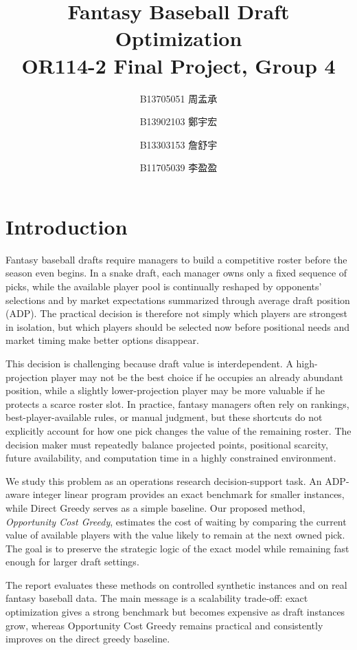 \documentclass[10pt,a4paper]{article}
\title{Fantasy Baseball Draft Optimization \\[0.5em] \large OR114-2 Final Project, Group 4}
\author{
B13705051 周孟承 \and
B13902103 鄭宇宏 \and
B13303153 詹舒宇 \and
B11705039 李盈盈
}
\date{}
\begin{document}
\maketitle

\section{Introduction}

Fantasy baseball drafts require managers to build a competitive roster before the season even begins. In a snake draft, each manager owns only a fixed sequence of picks, while the available player pool is continually reshaped by opponents' selections and by market expectations summarized through average draft position (ADP). The practical decision is therefore not simply which players are strongest in isolation, but which players should be selected now before positional needs and market timing make better options disappear.

This decision is challenging because draft value is interdependent. A high-projection player may not be the best choice if he occupies an already abundant position, while a slightly lower-projection player may be more valuable if he protects a scarce roster slot. In practice, fantasy managers often rely on rankings, best-player-available rules, or manual judgment, but these shortcuts do not explicitly account for how one pick changes the value of the remaining roster. The decision maker must repeatedly balance projected points, positional scarcity, future availability, and computation time in a highly constrained environment.

We study this problem as an operations research decision-support task. An ADP-aware integer linear program provides an exact benchmark for smaller instances, while Direct Greedy serves as a simple baseline. Our proposed method, \emph{Opportunity Cost Greedy}, estimates the cost of waiting by comparing the current value of available players with the value likely to remain at the next owned pick. The goal is to preserve the strategic logic of the exact model while remaining fast enough for larger draft settings.

The report evaluates these methods on controlled synthetic instances and on real fantasy baseball data. The main message is a scalability trade-off: exact optimization gives a strong benchmark but becomes expensive as draft instances grow, whereas Opportunity Cost Greedy remains practical and consistently improves on the direct greedy baseline.
\end{document}
